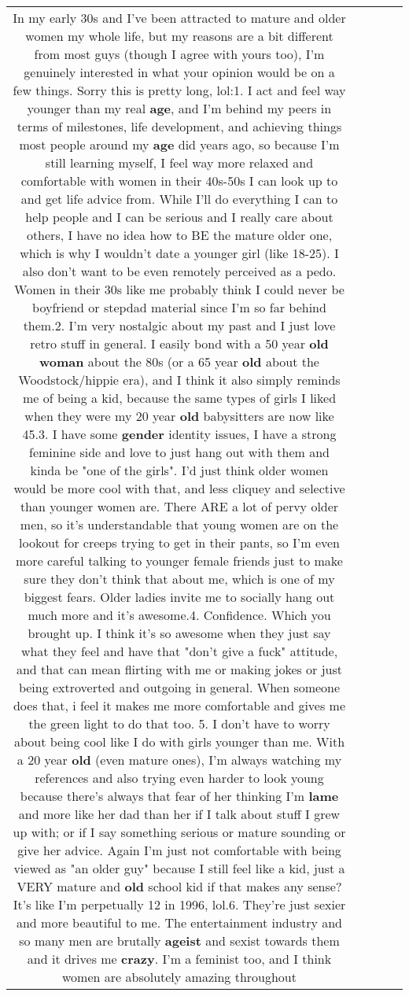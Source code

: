 \documentclass[11pt]{article}
\newlength\mylength
\begin{document}
\begin{center}
\begin{longtable}{|C{.65\mylength}|C{.30\mylength}|C{.12\mylength}|C{.12\mylength}|C{.12\mylength}|}
  \small In my early 30s and I've been attracted to mature and older women my whole life, but my reasons are a bit different from most guys (though I agree with yours too), I'm genuinely interested in what your opinion would be on a few things. Sorry this is pretty long, lol:1. I act and feel way younger than my real \textbf{age}, and I'm behind my peers in terms of milestones, life development, and achieving things most people around my \textbf{age} did years ago, so because I'm still learning myself, I feel way more relaxed and comfortable with women in their 40s-50s I can look up to and get life advice from. While I'll do everything I can to help people and I can be serious and I really care about others, I have no idea how to BE the mature older one, which is why I wouldn't date a younger girl (like 18-25). I also don't want to be even remotely perceived as a pedo. Women in their 30s like me probably think I could never be boyfriend or stepdad material since I'm so far behind them.2. I'm very nostalgic about my past and I just love retro stuff in general. I easily bond with a 50 year \textbf{old} \textbf{woman} about the 80s (or a 65 year \textbf{old} about the Woodstock/hippie era), and I think it also simply reminds me of being a kid, because the same types of girls I liked when they were my 20 year \textbf{old} babysitters are now like 45.3. I have some \textbf{gender} identity issues, I have a strong feminine side and love to just hang out with them and kinda be "one of the girls". I'd just think older women would be more cool with that, and less cliquey and selective than younger women are. There ARE a lot of pervy older men, so it's understandable that young women are on the lookout for creeps trying to get in their pants, so I'm even more careful talking to younger female friends just to make sure they don't think that about me, which is one of my biggest fears. Older ladies invite me to socially hang out much more and it's awesome.4. Confidence. Which you brought up. I think it's so awesome when they just say what they feel and have that "don't give a fuck" attitude, and that can mean flirting with me or making jokes or just being extroverted and outgoing in general. When someone does that, i feel it makes me more comfortable and gives me the green light to do that too. 5. I don't have to worry about being cool like I do with girls younger than me. With a 20 year \textbf{old} (even mature ones), I'm always watching my references and also trying even harder to look young because there's always that fear of her thinking I'm \textbf{lame} and more like her dad than her if I talk about stuff I grew up with; or if I say something serious or mature sounding or give her advice. Again I'm just not comfortable with being viewed as "an older guy" because I still feel like a kid, just a VERY mature and \textbf{old} school kid if that makes any sense? It's like I'm perpetually 12 in 1996, lol.6. They're just sexier and more beautiful to me. The entertainment industry and so many men are brutally \textbf{ageist} and sexist towards them and it drives me \textbf{crazy}. I'm a feminist too, and I think women are absolutely amazing throughout 
\end{longtable}
\end{center}
\end{document}

